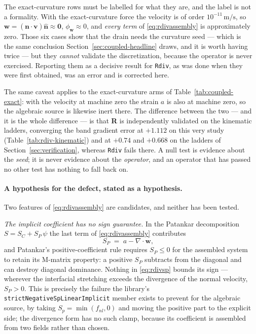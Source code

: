\documentclass[preprint,3p,11pt]{elsarticle}
\newcommand{\psilev}{\psi}
\newcommand{\nhat}{\hat{\mathbf{n}}}
\begin{document}
The exact-curvature rows must be labelled for what they are, and the label is not
a formality. With the exact-curvature force the velocity is of order
$10^{-11}\,\mathrm{m/s}$, so $\mathbf{w} = (\nhat\cdot\mathbf{v})\nhat \approx
\mathbf{0}$, $\phi_{\mathbf{w}} \approx 0$, and \emph{every term} of
\eqref{eq:rdivassembly} is approximately zero. Those six cases show that the drain
needs the curvature seed --- which is the same conclusion
Section~\ref{sec:coupled-headline} draws, and it is worth having twice --- but
they \emph{cannot} validate the discretization, because the operator is never
exercised. Reporting them as a decisive result for \texttt{Rdiv}, as was done
when they were first obtained, was an error and is corrected here.

The same caveat applies to the exact-curvature arms of
Table~\ref{tab:coupled-exact}: with the velocity at machine zero the strain $a$
is also at machine zero, so the algebraic source is likewise inert there. The
difference between the two --- and it is the whole difference --- is that
\textbf{R} is independently validated on the kinematic ladders, converging the
band gradient error at $+1.112$ on this very study
(Table~\ref{tab:rdiv-kinematic}) and at $+0.74$ and $+0.668$ on the ladders of
Section~\ref{sec:verification}, whereas \texttt{Rdiv} fails there. A null test is
evidence about the \emph{seed}; it is never evidence about the \emph{operator},
and an operator that has passed no other test has nothing to fall back on.

\paragraph{A hypothesis for the defect, stated as a hypothesis.} Two features of
\eqref{eq:rdivassembly} are candidates, and neither has been tested.

\emph{The implicit coefficient has no sign guarantee.} In the Patankar
decomposition $S = S_C + S_P\,\psilev$ the last term of
\eqref{eq:rdivassembly} contributes
\begin{equation}
  S_P \;=\; a - \nabla\cdot\mathbf{w},
  \label{eq:rdivsp}
\end{equation}
and Patankar's positive-coefficient rule \cite{patankar1980} requires
$S_P \le 0$ for the assembled system to retain its M-matrix property: a positive
$S_P$ subtracts from the diagonal and can destroy diagonal dominance. Nothing in
\eqref{eq:rdivsp} bounds its sign --- wherever the interfacial stretching exceeds
the divergence of the normal velocity, $S_P > 0$. This is precisely the failure
the library's \texttt{strictNegativeSpLinearImplicit} member exists to prevent
for the algebraic source, by taking $S_p = \min(f_{nl},0)$ and moving the
positive part to the explicit side; the divergence form has no such clamp,
because its coefficient is assembled from two fields rather than chosen.
\end{document}
